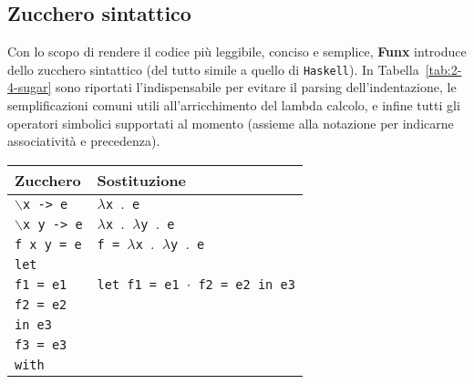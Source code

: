 \subsection{Zucchero sintattico}
\label{sec:2-4-syntactic-sugar}

Con lo scopo di rendere il codice più leggibile, conciso e semplice, \textbf{Funx} introduce
dello zucchero sintattico (del tutto simile a quello di \texttt{Haskell}).
In Tabella~\ref{tab:2-4-sugar} sono riportati l'indispensabile per evitare il parsing dell'indentazione,
le semplificazioni comuni utili all'arricchimento del lambda calcolo, e infine tutti gli operatori simbolici
supportati al momento (assieme alla notazione per indicarne associatività e precedenza).

\newpage

\begin{table}[H]
    \begin{center}
        \begin{tabularx}{\textwidth}{|P{15em}|X|}
            \hline
            \textbf{Zucchero}                & \textbf{Sostituzione}                                            \\
            \hline
            \texttt{$\backslash$x -> e}      & \texttt{$\lambda$x $\mathord{.}$ e}                              \\
            \hline
            \texttt{$\backslash$x y -> e}    & \texttt{$\lambda$x $\mathord{.}$ $\lambda$y $\mathord{.}$ e}     \\
            \hline
            \texttt{f x y = e}               & \texttt{f = $\lambda$x $\mathord{.}$ $\lambda$y $\mathord{.}$ e} \\
            \hline
            \texttt{let}                     &                                                                  \\
            \texttt{f1 = e1}                 & \texttt{let f1 = e1 $\cdot$ f2 = e2 in e3}                       \\
            \texttt{f2 = e2}                 &                                                                  \\
            \texttt{in e3}                   &                                                                  \\
            \hline
            \texttt{f3 = e3}                 &                                                                  \\
            \texttt{with}                    &                                                                  \\

\end{tabularx}
\end{center}
\end{table}
